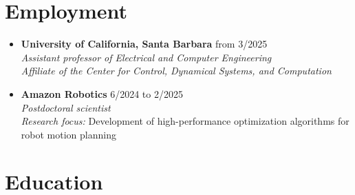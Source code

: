 \documentclass[11pt,a4paper,sans]{moderncv}
\begin{document}
\makecvtitle

%

\section{Employment}

\vspace{5pt}

\begin{itemize}


\item \textbf{University of California, Santa Barbara} \hfill from 3/2025 \\
\textit{Assistant professor of Electrical and Computer Engineering} \\
\textit{Affiliate of the Center for Control, Dynamical Systems, and Computation}

\item \textbf{Amazon Robotics} \hfill 6/2024 to 2/2025 \\
\textit{Postdoctoral scientist} \\
\textit{Research focus:} Development of high-performance optimization algorithms for robot motion planning

\end{itemize}

\section{Education}
\end{document}
